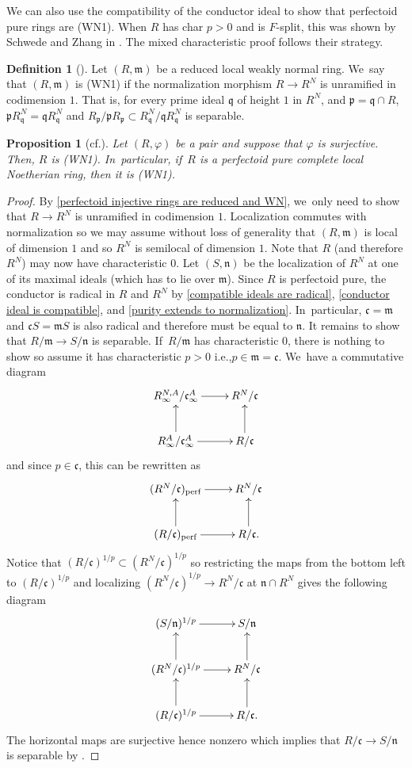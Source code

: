\documentclass[11pt]{article}
\newcommand{\ie}{i.e.,\xspace}
\newcommand{\cf}{cf.\xspace}
\let\autoref\cref
\theoremstyle{plain}
\newtheorem{proposition}[theorem]{Proposition}
\theoremstyle{definition}
\newtheorem{definition}[theorem]{Definition}
\numberwithin{equation}{theorem}
\newcommand{\fracc}{\mathfrak{c}}
\newcommand{\fram}{\mathfrak{m}}
\newcommand{\fran}{\mathfrak{n}}
\newcommand{\p}{\mathfrak{p}}
\newcommand{\q}{\mathfrak{q}}
\newcommand{\perf}{_{\mathrm{perf}}}
\newcommand{\unp}{{1/{p}}}
\renewcommand{\phi}{\varphi}
\newcommand{\rphi}{(R,\phi)}
\newcommand{\rafty}{R^A_\infty}
\newcommand{\ranfty}{R^{N,A}_\infty}
\newcommand{\cafty}{\fracc^A_\infty}
\begin{document}
We can also use the compatibility of the conductor ideal to show that perfectoid pure rings are (WN1). When $R$ has char $p>0$ and is $F$-split, this was shown by Schwede and Zhang in \cite{SchwedeZhangBertiniTheoremsForFSings}. The mixed characteristic proof follows their strategy.

\begin{definition}[{\cite{CuminoManaresiSingularitiesWeaklyNormal}}]
Let $(R,\fram)$ be a reduced local weakly normal ring. We~say that $(R,\fram)$ is (WN1) if the normalization morphism $R\to R^N$ is unramified in codimension $1$. That is, for every prime ideal $\q$ of height $1$ in $R^N$, and $\p=\q\cap R$, $\p R^N_\q=\q R^N_\q$ and $R_\p/\p R_\p\subset R^N_\q/\q R^N_\q$ is separable.
\end{definition}

\begin{proposition}[{\cf \cite[Th.\,7.3]{SchwedeZhangBertiniTheoremsForFSings}}]
Let $\rphi$ be a pair and suppose that $\phi$ is surjective. Then, $R$ is \emph{(WN1)}. In~particular, if~$R$ is a perfectoid pure complete local Noetherian ring, then it is \emph{(WN1)}.
\end{proposition}

\begin{proof}
By \autoref{perfectoid injective rings are reduced and WN}, we~only need to show that $R\to R^N$ is unramified in codimension $1$.
Localization commutes with normalization so we may assume without loss of generality that $(R,\fram)$ is local of dimension $1$ and so $R^N$ is semilocal of dimension $1$. Note that $R$ (and therefore $R^N$) may now have characteristic $0$. Let $(S,\fran)$ be the localization of $R^N$ at one of its maximal ideals (which has to lie over $\fram$). Since $R$ is perfectoid pure, the conductor is radical in $R$ and $R^N$ by \autoref{compatible ideals are radical}, \autoref{conductor ideal is compatible}, and \autoref{purity extends to normalization}. In~particular, $\fracc=\fram$ and $\fracc S=\fram S$ is also radical and therefore must be equal to $\fran$. It remains to show that $R/\fram\to S/\fran$ is separable. If~$R/\fram$ has characteristic $0$, there is nothing to show so assume it has characteristic $p>0$ \ie $p\in \fram=\fracc$. We~have a commutative diagram
\[
\xymatrix{
\ranfty/\cafty \ar[r] & R^N/\fracc \\
\rafty/\cafty \ar[u]\ar[r]& R/\fracc \ar[u]
}
\]
and since $p\in \fracc$, this can be rewritten as
\[
\xymatrix{
(R^N/\fracc)\perf \ar[r] & R^N/\fracc \\
(R/\fracc)\perf \ar[u]\ar[r]&\ar[u] R/\fracc.
}
\]
Notice that $(R/\fracc)^\unp\subset(R^N/\fracc)^\unp $ so restricting the maps from the bottom left to $(R/\fracc)^\unp$ and localizing $(R^N/\fracc)^\unp\to R^N/\fracc$ at $\fran\cap R^N$
gives the following diagram
\[
\xymatrix{
(S/\fran)^\unp \ar[r] & S/\fran\\
(R^N/\fracc)^\unp \ar[r]\ar[u] & R^N/\fracc \ar[u]\\
(R/\fracc)^\unp \ar[u]\ar[r]& R/\fracc. \ar[u]
}
\]
The horizontal maps are surjective hence nonzero which implies that $R/\fracc\to S/\fran$ is separable by \cite[Ex.\,5.1]{SchwedeTuckerTestIdealFiniteMaps}.
\end{proof}
\end{document}
